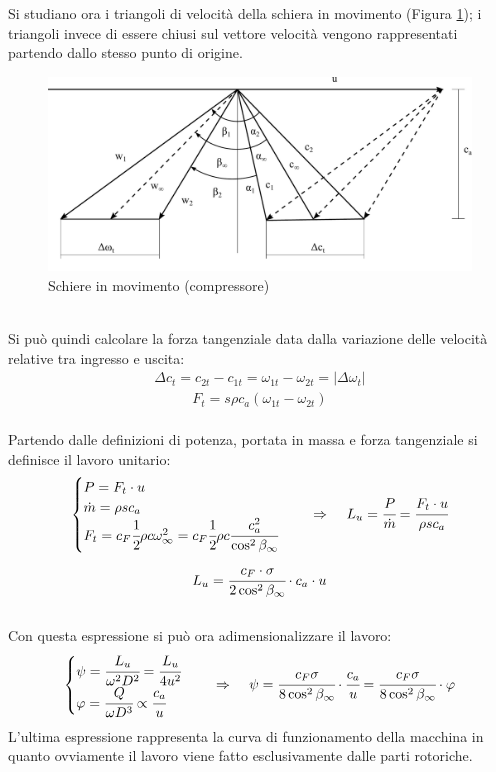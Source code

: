 Si studiano ora i triangoli di velocità della schiera in movimento (Figura \ref{fig:SchiereCompr}); i triangoli invece di essere chiusi sul vettore velocità vengono rappresentati partendo dallo stesso punto di origine. 
\begin{figure}
\centering
  \includegraphics[width=\textwidth]{fig/SchiereCompr.pdf}
\caption{Schiere in movimento (compressore)}
\label{fig:SchiereCompr}
\end{figure}
\\Si può quindi calcolare la forza tangenziale data dalla variazione delle velocità relative tra ingresso e uscita:
\begin{align*}
\Delta c_t = c_{2t} - c_{1t} = \omega_{1t} - \omega_{2t} = |\Delta \omega_t |
\end{align*}
\begin{align*}
F_t = s \rho c_a (\omega_{1t} - \omega_{2t})
\end{align*}
\\Partendo dalle definizioni di potenza, portata in massa e forza tangenziale si definisce il lavoro unitario:
\begin{align*}
\begin{cases}
P=F_t \cdot u\\
\dot{m} = \rho s c_a\\
F_t = c_F \cfrac{1}{2} \rho c \omega_{\infty}^2 = c_F \cfrac{1}{2} \rho c \cfrac{c_a^2}{\cos^2 \beta_{\infty}}
\end{cases} \;\;\;\;
\Rightarrow \;\;\;\;
L_u = \cfrac{P}{\dot{m}}= \cfrac{F_t \cdot u}{\rho s c_a}
\end{align*}
\begin{align*}
L_u = \cfrac{c_F \cdot \sigma}{2 \cos^2 \beta_{\infty}} \cdot c_a \cdot u
\end{align*}
\\Con questa espressione si può ora adimensionalizzare il lavoro:
\begin{align*}
\begin{cases}
\psi = \cfrac{L_u}{\omega ^2 D^2} = \cfrac{L_u}{4 u^2}\\
\varphi = \cfrac{Q}{\omega D^3} \propto \cfrac{c_a}{u}
\end{cases} \;\;\;\;
\Rightarrow \;\;\;\;
\psi = \cfrac{c_F \sigma}{8 \cos^2 \beta_{\infty}} \cdot \cfrac{c_a}{u} = \cfrac{c_F \sigma}{8 \cos^2 \beta_{\infty}} \cdot \varphi
\end{align*}
L'ultima espressione rappresenta la curva di funzionamento della macchina in quanto ovviamente il lavoro viene fatto esclusivamente dalle parti rotoriche.

